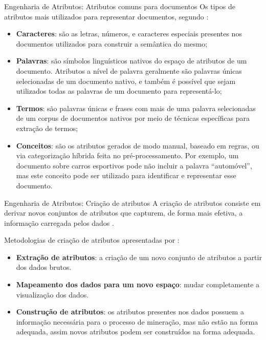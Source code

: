 \documentclass[%
  10pt,%
  aspectratio = 169,%
  compress,%
  t,%
]{beamer}%
\begin{document}
    \begin{frame}[fragile = singleslide]{}{Engenharia de Atributos: Atributos comuns para documentos}
        Os tipos de atributos mais utilizados para representar documentos, segundo  \cite[p.~5--7]{Feldman:2006:TMH:1076381}:
        \begin{itemize}
            \item \textbf{Caracteres}: são as letras, números, e caracteres especiais presentes nos documentos utilizados para construir a semântica do mesmo;

            \item \textbf{Palavras}: são símbolos linguísticos nativos do espaço de atributos de um documento.
            Atributos a nível de palavra geralmente são palavras únicas selecionadas de um documento nativo, e também é possível que sejam utilizados todas as palavras de um documento para representá-lo;

            \item \textbf{Termos}: são palavras únicas e frases com mais de uma palavra selecionadas de um corpus de documentos nativos por meio de técnicas específicas para extração de termos;

            \item \textbf{Conceitos}: são os atributos gerados de modo manual, baseado em regras, ou via categorização híbrida feita no pré-processamento.
            Por exemplo, um documento sobre carros esportivos pode não incluir a palavra ``automóvel'', mas este conceito pode ser utilizado para identificar e representar esse documento.
        \end{itemize}

    \end{frame}

    \begin{frame}[fragile = singleslide]{}{Engenharia de Atributos: Criação de atributos}
        A criação de atributos consiste em derivar novos conjuntos de atributos que capturem, de forma mais efetiva, a informação carregada pelos dados \cite[p.~55]{TanIDM2014}.

        Metodologias de criação de atributos apresentadas por \cite[p.~55--57]{TanIDM2014}:
        \begin{itemize}
            \item \textbf{Extração de atributos}: a criação de um novo conjunto de atributos a partir dos dados brutos.

            \item \textbf{Mapeamento dos dados para um novo espaço}: mudar completamente a visualização dos dados.

            \item \textbf{Construção de atributos}: os atributos presentes nos dados possuem a informação necessária para o processo de mineração, mas não estão na forma adequada, assim novos atributos podem ser construídos na forma adequada.
        \end{itemize}

    \end{frame}
\end{document}

